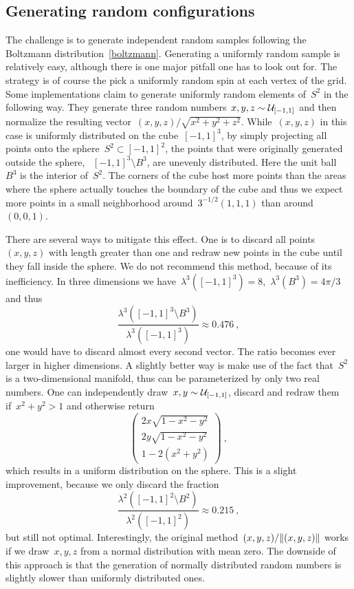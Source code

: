 \subsection{Generating random configurations}\label{subsec:random}

The challenge is to generate independent random samples following the Boltzmann
distribution~\eqref{boltzmann}. Generating a uniformly random sample is
relatively easy, although there is one major pitfall one has to look out for.
The strategy is of course the pick a uniformly random spin at each vertex of the
grid. Some implementations claim to generate uniformly random elements of~$S^2$
in the following way. They generate three random numbers~$x,y,z \sim
\mathcal{U}_{[-1,1]}$ and then normalize the resulting vector~$(x,y,z) / \sqrt{x^2 + y^2
+ z^2}$. While~$(x,y,z)$ in this case is uniformly distributed on the
cube~$[-1,1]^3$, by simply projecting all points onto the sphere~$S^2 \subset
[-1,1]^2$, the points that were originally generated outside the sphere,
\ie{}~$[-1,1]^3 \setminus B^3$, are unevenly distributed. Here the unit
ball~$B^3$ is the interior of~$S^2$. The corners of the cube host more points
than the areas where the sphere actually touches the boundary of the cube and
thus we expect more points in a small neighborhood around~$3^{-1/2} (1,1,1)$
than around~$(0,0,1)$.

There are several ways to mitigate this effect. One is to discard all
points~$(x,y,z)$ with length greater than one and redraw new points in the cube
until they fall inside the sphere. We do not recommend this method, because of
its inefficiency. In three dimensions we have~$\lambda^3([-1,1]^3) =
8$,~$\lambda^3(B^3) = 4 \pi / 3$ and thus
%
\begin{equation}
  \frac{\lambda^3([-1,1]^3 \setminus B^3)}{\lambda^3([-1,1]^3)} \approx 0.476\:,
\end{equation}
%
\ie{} one would have to discard almost every second vector. The ratio becomes
ever larger in higher dimensions. A slightly better way is make use of the fact
that~$S^2$ is a two-dimensional manifold, thus can be parameterized by only two
real numbers. One can independently draw~$x,y \sim \mathcal{U}_{[-1,1]}$, discard and
redraw them if~$x^2 + y^2 > 1$ and otherwise return
%
\begin{equation}
  \begin{pmatrix}
    2 x \sqrt{1 - x^2 - y^2} \\
    2 y \sqrt{1 - x^2 - y^2} \\
    1 - 2 (x^2 + y^2)
  \end{pmatrix} \:,
\end{equation}
%
which results in a uniform distribution on the sphere. This is a slight
improvement, because we only discard the fraction
%
\begin{equation}
  \frac{\lambda^2([-1,1]^2 \setminus B^2)}{\lambda^2([-1,1]^2)} \approx 0.215\:,
\end{equation}
%
but still not optimal. Interestingly, the original
method~$(x,y,z)/\norm{(x,y,z)}$ works if we draw~$x,y,z$ from a normal
distribution with mean zero. The downside of this approach is that the
generation of normally distributed random numbers is slightly slower than
uniformly distributed ones.

